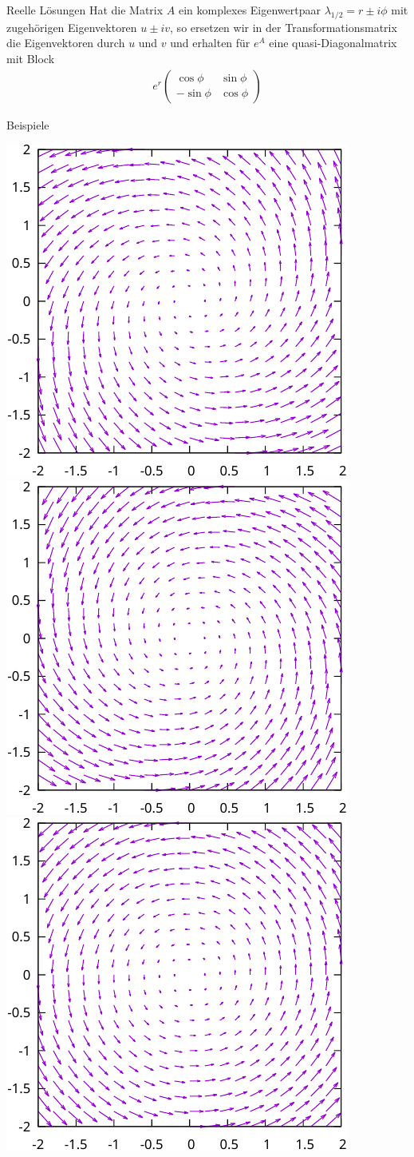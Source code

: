 \documentclass[notheorems,hidelinks,aspectratio=1610]{beamer}
\begin{document}
\begin{frame}
  \begin{block}{Reelle Lösungen}
    Hat die Matrix $A$ ein komplexes Eigenwertpaar
    $\lambda_{1/2} = r\pm i\phi$ mit zugehörigen Eigenvektoren
    $u\pm iv$, so ersetzen wir in der Transformationsmatrix die
    Eigenvektoren durch $u$ und $v$ und erhalten für $e^A$ eine
    quasi-Diagonalmatrix mit Block
    \begin{gather*}
      e^r
      \begin{pmatrix}
        \cos\phi & \sin\phi\\
        -\sin\phi & \cos \phi
      \end{pmatrix}
    \end{gather*}
  \end{block}
\end{frame}

\begin{frame}{Beispiele}
  \begin{center}
    \includegraphics[width=.32\textwidth]{gnuplot/linear-cp-crop.pdf}
    \hfill
    \includegraphics[width=.32\textwidth]{gnuplot/linear-cm-crop.pdf}
    \hfill
    \includegraphics[width=.32\textwidth]{gnuplot/linear-c0-crop.pdf}
  \end{center}  
\end{frame}
\end{document}
